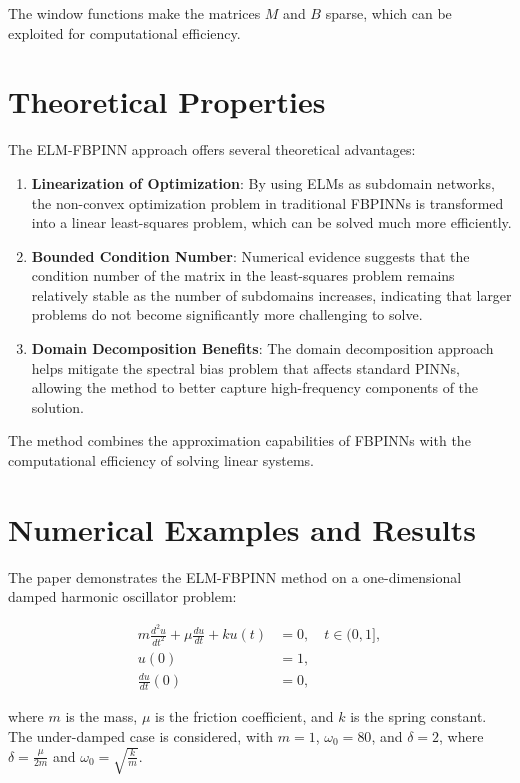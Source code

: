 \documentclass[11pt]{article}
\begin{document}
The window functions make the matrices $M$ and $B$ sparse, which can be exploited for computational efficiency.

\section{Theoretical Properties}

The ELM-FBPINN approach offers several theoretical advantages:

\begin{enumerate}
    \item \textbf{Linearization of Optimization}: By using ELMs as subdomain networks, the non-convex optimization problem in traditional FBPINNs is transformed into a linear least-squares problem, which can be solved much more efficiently.
    
    \item \textbf{Bounded Condition Number}: Numerical evidence suggests that the condition number of the matrix in the least-squares problem remains relatively stable as the number of subdomains increases, indicating that larger problems do not become significantly more challenging to solve.
    
    \item \textbf{Domain Decomposition Benefits}: The domain decomposition approach helps mitigate the spectral bias problem that affects standard PINNs, allowing the method to better capture high-frequency components of the solution.
\end{enumerate}

The method combines the approximation capabilities of FBPINNs with the computational efficiency of solving linear systems.

\section{Numerical Examples and Results}

The paper demonstrates the ELM-FBPINN method on a one-dimensional damped harmonic oscillator problem:

\begin{align}
    m\frac{d^2u}{dt^2} + \mu\frac{du}{dt} + ku(t) &= 0, \quad t \in (0,1], \\
    u(0) &= 1, \\
    \frac{du}{dt}(0) &= 0,
\end{align}

where $m$ is the mass, $\mu$ is the friction coefficient, and $k$ is the spring constant. The under-damped case is considered, with $m=1$, $\omega_0=80$, and $\delta=2$, where $\delta = \frac{\mu}{2m}$ and $\omega_0 = \sqrt{\frac{k}{m}}$.
\end{document}
